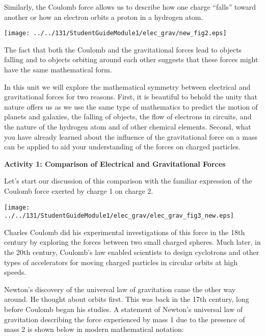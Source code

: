 \pagebreak[2]
Similarly, the Coulomb force allows us to describe how one charge ``falls''
toward another or how an electron orbits a proton in a hydrogen atom. 

\answerspace{0.3cm}
\begin{center}
\texttt{[image: ../../131/StudentGuideModule1/elec\_grav/new\_fig2.eps]} 
\end{center}
\answerspace{0.3cm}

The fact that both the Coulomb and the gravitational forces lead to objects
falling and to objects orbiting around each other suggests that these forces
might have the same mathematical form. 

In this unit we will explore the mathematical symmetry between electrical and
gravitational forces for two reasons. First, it is beautiful to behold the unity
that nature offers us as we use the same type of mathematics to predict the
motion of planets and galaxies, the falling of objects, the flow of electrons
in circuits, and the nature of the hydrogen atom and of other chemical elements.
Second, what you have already learned about the influence of the gravitational
force on a mass can be applied to aid your understanding of the forces on charged
particles. 

\textbf{Activity 1: Comparison of Electrical and Gravitational Forces }

Let's start our discussion of this comparison with the familiar expression of
the Coulomb force exerted by charge 1 on charge 2. 

\answerspace{0.3cm}
{\par\centering \texttt{[image: ../../131/StudentGuideModule1/elec\_grav/elec\_grav\_fig3\_new.eps]} \par}
\answerspace{0.3cm}

Charles Coulomb did his experimental investigations of this force in the 18th
century by exploring the forces between two small charged spheres. Much later,
in the 20th century, Coulomb's law enabled scientists to design cyclotrons and
other types of accelerators for moving charged particles in circular orbits
at high speeds. 

Newton's discovery of the universal law of gravitation came the other way around.
He thought about orbits first. This was back in the 17th century, long before
Coulomb began his studies. A statement of Newton's universal law of gravitation
describing the force experienced by mass 1 due to the presence of mass 2 is
shown below in modern mathematical notation: 

